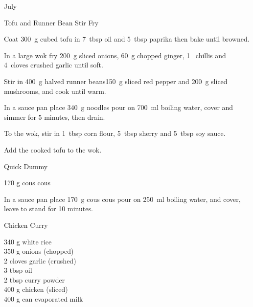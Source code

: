 \begin{menu}{July}
\begin{recipe}{2}{Tofu and Runner Bean Stir Fry}
    \begin{instructions}
    \item 
        Coat
        300~g cubed tofu
        in
        7~tbsp  oil
        and
        5~tbsp  paprika
        then bake until browned.
      \item 
        In a large wok fry 200~g sliced onions,
        60~g chopped ginger,
        1~  chillis
        and
        4~cloves crushed garlic
        until soft.
      \item 
        Stir in
        400~g halved runner beans150~g sliced red pepper
        and
        200~g sliced mushrooms,
        and cook until warm.
      \item 
    In a
    sauce pan
    place
    340~g  noodles
    pour on
    700~ml  boiling water,
    cover and simmer for 5 minutes, then drain.
  \item 
        To the wok, stir in
        1~tbsp  corn flour,
        5~tbsp  sherry
        and
        5~tbsp  soy sauce.
      \item 
        Add the cooked tofu to the wok.
      
    \end{instructions}
    \end{recipe}%
  
    \begin{recipe}{1}{Quick Dummy}%
		\begin{ingredients}
		170 g cous cous  \\
	
		\end{ingredients}
	
	
    \begin{instructions}
    \item 
    In a
    sauce pan 
    place
    170~g  cous cous
    pour on
    250~ml  boiling water,
    and cover, leave to stand for 10 minutes.
  
    \end{instructions}
    \end{recipe}%
  
    \begin{recipe}{2}{Chicken Curry}%
		\begin{ingredients}
		340 g white rice  \\
	350 g onions (chopped) \\
	2 cloves garlic (crushed) \\
	3 tbsp oil  \\
	2 tbsp curry powder  \\
	400 g chicken (sliced) \\
	400 g can evaporated milk  \\
	

\end{ingredients}
\end{recipe}
\end{menu}
